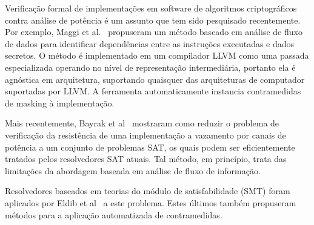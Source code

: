 \documentclass{SBCbookchapter}
\begin{document}
Verificação formal de implementações em software de algoritmos criptográficos contra análise de potência é um assunto que tem sido pesquisado recentemente.
%
%
Por exemplo, Maggi et al.~\cite{maggi2013automated, Agosta2013} propuseram um método baseado em análise de fluxo de dados para identificar dependências entre as instruções executadas e dados secretos.
%
%
O método é implementado em um compilador LLVM como uma passada especializada operando no nível de representação intermediária, portanto ela é agnóstica em arquitetura, suportando quaisquer das arquiteturas de computador suportadas por LLVM. A ferramenta automaticamente instancia contramedidas de masking à implementação.
%


Mais recentemente, Bayrak et al~\cite{BayrakRegazzoniNovo2013, Bayrak2014} mostraram como reduzir o problema de verificação da resistência de uma implementação a vazamento por canais de potência a um conjunto de problemas SAT, os quais podem ser eficientemente tratados pelos resolvedores SAT atuais. Tal método, em princípio,  trata das limitações da abordagem baseada em análise de fluxo de informação.

%
Resolvedores baseados em teorias do módulo de satisfabilidade (SMT) foram aplicados por Eldib et al~\cite{EldibWang2014, EldibWang2014_QMS, EldibWang2014_SMT, EldibWang2014_sc_sniffer} a este problema. Estes últimos também propuseram métodos para a aplicação automatizada de contramedidas.
\end{document}
